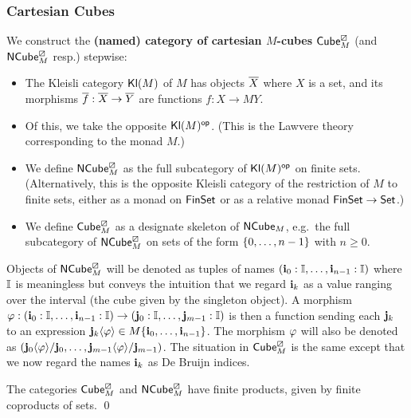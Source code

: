 \documentclass[a4paper]{memoir}
\begin{document}
\subsubsection{Cartesian Cubes}
\begin{definition} \label{def:cube}
	We construct the \textbf{(named) category of cartesian $M$-cubes} ${\mathsf{Cube}}^\boxslash_M$ (and ${\mathsf{NCube}}^\boxslash_M$ resp.) stepwise:
	\begin{itemize}
		\item The Kleisli category ${\mathsf{Kl}}(M)$ of $M$ has objects ${\overline{X}}$ where $X$ is a set, and its morphisms ${\overline{f}} : {\overline{X}} \to {\overline{Y}}$ are functions $f : X \to MY$.
		\item Of this, we take the opposite ${\mathsf{Kl}}(M)^{\mathsf{op}}$. (This is the Lawvere theory corresponding to the monad $M$.)
		\item We define ${\mathsf{NCube}}^\boxslash_M$ as the full subcategory of ${\mathsf{Kl}}(M)^{\mathsf{op}}$ on finite sets. (Alternatively, this is the opposite Kleisli category of the restriction of $M$ to finite sets, either as a monad on ${\mathsf{FinSet}}$ or as a relative monad ${\mathsf{FinSet}} \to {\mathsf{Set}}$.)
		\item We define ${\mathsf{Cube}}^\boxslash_M$ as a designate skeleton of ${\mathsf{NCube}}_M$, e.g.\ the full subcategory of ${\mathsf{NCube}}^\boxslash_M$ on sets of the form $\mathopen{}\left\{ 0, \ldots, n-1 \right\}\mathclose{}$ with $n \geq 0$.
	\end{itemize}
\end{definition}
Objects of ${\mathsf{NCube}}^\boxslash_M$ will be denoted as tuples of names $(\mathbf{i}_0 : {\mathbb I}, \ldots, \mathbf{i}_{n-1} : {\mathbb I})$ where ${\mathbb I}$ is meaningless but conveys the intuition that we regard $\mathbf{i}_k$ as a value ranging over the interval (the cube given by the singleton object).
A morphism $\varphi : (\mathbf{i}_0 : {\mathbb I}, \ldots, \mathbf{i}_{n-1} : {\mathbb I}) \to (\mathbf{j}_0 : {\mathbb I}, \ldots, \mathbf{j}_{m-1} : {\mathbb I})$ is then a function sending each $\mathbf{j}_k$ to an expression $\mathbf{j}_k \langle \varphi \rangle \in M\mathopen{}\left\{ \mathbf{i}_0, \ldots, \mathbf{i}_{n-1} \right\}\mathclose{}$.
The morphism $\varphi$ will also be denoted as $(\mathbf{j}_0 \langle \varphi \rangle / \mathbf{j}_0, \ldots, \mathbf{j}_{m-1} \langle \varphi \rangle / \mathbf{j}_{m-1})$.
The situation in ${\mathsf{Cube}}^\boxslash_M$ is the same except that we now regard the names $\mathbf{i}_k$ as De Bruijn indices.

\begin{corollary}
The categories ${\mathsf{Cube}}^\boxslash_M$ and ${\mathsf{NCube}}^\boxslash_M$ have finite products, given by finite coproducts of sets. \qed
\end{corollary}
\end{document}
